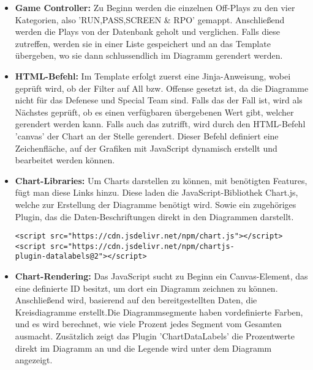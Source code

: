 \begin{itemize}
    \item \textbf{Game Controller:} Zu Beginn werden die einzelnen Off-Plays zu den vier Kategorien, also 'RUN,PASS,SCREEN \& RPO' gemappt. Anschließend werden die Plays von der Datenbank geholt und verglichen. Falls diese zutreffen, werden sie in einer Liste gespeichert und an das Template übergeben, wo sie dann schlussendlich im Diagramm gerendert werden.
    \item \textbf{HTML-Befehl:} Im Template erfolgt zuerst eine Jinja-Anweisung, wobei geprüft wird, ob der Filter auf All bzw. Offense gesetzt ist, da die Diagramme nicht für das Defenese und Special Team sind. Falls das der Fall ist, wird als Nächstes geprüft, ob es einen verfügbaren übergebenen Wert gibt, welcher gerendert werden kann. Falls auch das zutrifft, wird durch den HTML-Befehl 'canvas' der Chart an der Stelle gerendert. Dieser Befehl definiert eine Zeichenfläche, auf der Grafiken mit JavaScript dynamisch erstellt und bearbeitet werden können.
    \item \textbf{Chart-Libraries:} Um Charts darstellen zu können, mit benötigten Features, fügt man diese Links hinzu. Diese laden die JavaScript-Bibliothek Chart.js, welche zur Erstellung der Diagramme benötigt wird. Sowie ein zugehöriges Plugin, das die Daten-Beschriftungen direkt in den Diagrammen darstellt.
    \begin{verbatim}
<script src="https://cdn.jsdelivr.net/npm/chart.js"></script>
<script src="https://cdn.jsdelivr.net/npm/chartjs-
plugin-datalabels@2"></script>
    \end{verbatim}
    \item \textbf{Chart-Rendering:} Das JavaScript sucht zu Beginn ein Canvas-Element, das eine definierte ID besitzt, um dort ein Diagramm zeichnen zu können. Anschließend wird, basierend auf den bereitgestellten Daten, die Kreisdiagramme erstellt.Die Diagrammsegmente haben vordefinierte Farben, und es wird berechnet, wie viele Prozent jedes Segment vom Gesamten ausmacht. Zusätzlich zeigt das Plugin 'ChartDataLabels' die Prozentwerte direkt im Diagramm an und die Legende wird unter dem Diagramm angezeigt.
\end{itemize}

